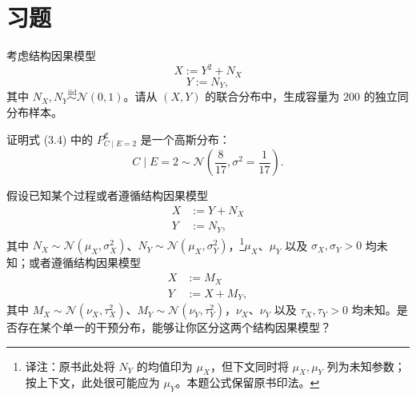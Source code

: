 \section{习题}
\label{sec:ch03-problems}
\setcounter{problem}{4}

\begin{problem}[从结构因果模型中抽样]
考虑结构因果模型
\begin{equation}
 X:=Y^2+N_X
 \tag{3.10}
\end{equation}
\begin{equation}
 Y:=N_Y,
 \tag{3.11}
\end{equation}
其中 $N_X,N_Y\overset{\mathrm{iid}}{\sim}\mathcal{N}(0,1)$。请从 $(X,Y)$ 的联合分布中，生成容量为 $200$ 的独立同分布样本。
\end{problem}

\begin{problem}[条件分布]
证明式 (3.4) 中的 $P_{C\mid E=2}^{\mathfrak{C}}$ 是一个高斯分布：
\[
 C\mid E=2\sim\mathcal{N}\left(\frac{8}{17},\sigma^2=\frac{1}{17}\right).
\]
\end{problem}

\begin{problem}[干预]
假设已知某个过程或者遵循结构因果模型
\[
 \begin{aligned}
 X&:=Y+N_X\\
 Y&:=N_Y,
 \end{aligned}
\]
其中 $N_X\sim\mathcal{N}(\mu_X,\sigma_X^2)$、$N_Y\sim\mathcal{N}(\mu_X,\sigma_Y^2)$，\footnote{译注：原书此处将 $N_Y$ 的均值印为 $\mu_X$，但下文同时将 $\mu_X,\mu_Y$ 列为未知参数；按上下文，此处很可能应为 $\mu_Y$。本题公式保留原书印法。}$\mu_X$、$\mu_Y$ 以及 $\sigma_X,\sigma_Y>0$ 均未知；或者遵循结构因果模型
\[
 \begin{aligned}
 X&:=M_X\\
 Y&:=X+M_Y,
 \end{aligned}
\]
其中 $M_X\sim\mathcal{N}(\nu_X,\tau_X^2)$、$M_Y\sim\mathcal{N}(\nu_Y,\tau_Y^2)$，$\nu_X$、$\nu_Y$ 以及 $\tau_X,\tau_Y>0$ 均未知。是否存在某个单一的干预分布，能够让你区分这两个结构因果模型？
\end{problem}

